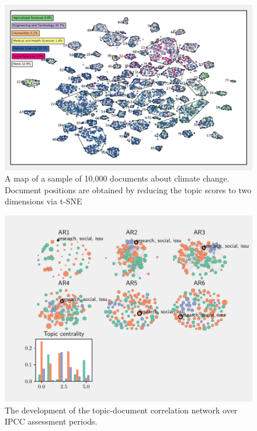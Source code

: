\documentclass{article}
\begin{document}
\begin{linenumbers}
\begin{figure}
	\begin{center}
		\includegraphics[width=1\linewidth]{plots/tsne.png}
		\caption{A map of a sample of 10,000 documents about climate change. Document positions are obtained by reducing the topic scores to two dimensions via t-SNE}
		\label{}
	\end{center}
\end{figure}

\begin{figure}
	\begin{center}
		\includegraphics[width=1\linewidth]{plots/network_development_wgs_665.pdf}
		\caption{The development of the topic-document correlation network over IPCC assessment periods.}
		\label{}
	\end{center}
\end{figure}


\end{linenumbers}
\end{document}
